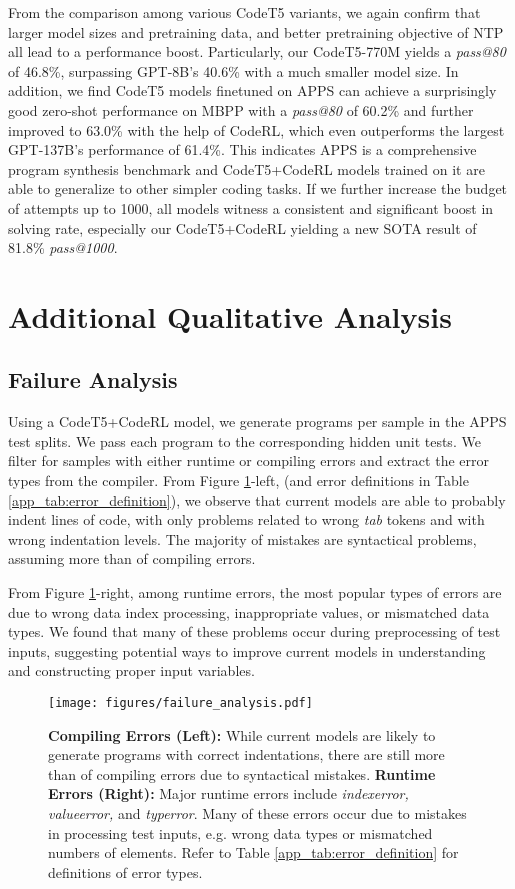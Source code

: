 \documentclass{article}
\begin{document}
From the comparison among various CodeT5 variants, we again confirm  that larger model sizes and pretraining data, and better pretraining objective of NTP all lead to a performance boost. Particularly, our CodeT5-770M yields a \emph{pass@80} of 46.8\%, surpassing GPT-8B's 40.6\% with a much smaller model size.
In addition, we find  CodeT5 models finetuned on APPS can achieve a surprisingly good zero-shot performance on MBPP with a \emph{pass@80} of 60.2\% and further improved to 63.0\% with the help of CodeRL, which even outperforms the largest GPT-137B's performance of 61.4\%.
This indicates APPS is a comprehensive  program synthesis benchmark and  CodeT5+CodeRL models trained on it are able to generalize to other simpler coding tasks.
If we further increase the budget of attempts up to 1000,  all models witness a consistent and significant boost in solving rate, especially our  CodeT5+CodeRL  yielding a new SOTA result of 81.8\% \emph{pass@1000}.

\section{Additional Qualitative Analysis}
\subsection{Failure Analysis} 
\label{app_sec:failure_analysis}

Using a CodeT5+CodeRL model, we generate  programs per sample in the APPS test splits.
We pass each program to the corresponding hidden unit tests.
We filter for samples with either runtime or compiling errors and extract the error types from the compiler.
From Figure \ref{app_fig:failure_analysis}-left, (and error definitions in Table \ref{app_tab:error_definition}), we observe that current models are able to probably indent lines of code, with only  problems related to wrong \emph{tab} tokens and  with wrong indentation levels. 
The majority of mistakes are syntactical problems, assuming more than  of compiling errors. 

From Figure \ref{app_fig:failure_analysis}-right, among runtime errors, the most popular types of errors are due to wrong data index processing, inappropriate values, or mismatched data types. 
We found that many of these problems occur during preprocessing of test inputs, suggesting potential ways to improve current models in understanding and constructing proper input variables.

\begin{figure}[t]
	\centering
	\resizebox{1.0\textwidth}{!} {
	\texttt{[image: figures/failure\_analysis.pdf]}
	}
	\caption{
	\textbf{Compiling Errors (Left):}
	While current models are likely to generate programs with correct indentations, there are still more than  of compiling errors due to syntactical mistakes.
	\textbf{Runtime Errors (Right):}
	Major runtime errors include \emph{indexerror, valueerror,} and \emph{typerror}. 
	Many of these errors occur due to mistakes in processing test inputs, e.g. wrong data types or mismatched numbers of elements. 
	Refer to Table \ref{app_tab:error_definition} for definitions of error types.
	}
	\label{app_fig:failure_analysis}
\end{figure}
\end{document}
